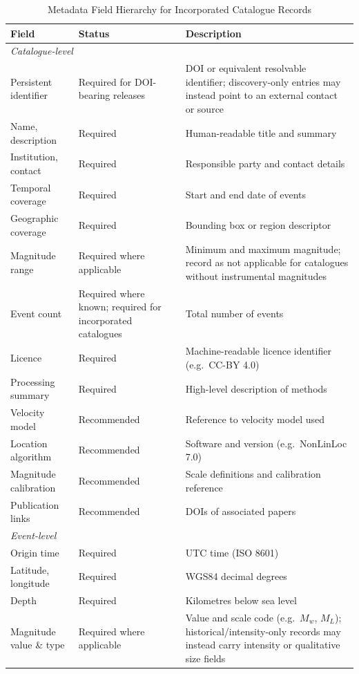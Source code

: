 \documentclass[11pt]{article}
\begin{document}
\begin{table}[H]
\centering
\small
\caption{Metadata Field Hierarchy for Incorporated Catalogue Records}
\label{tab:metadata_fields}
\setlength{\tabcolsep}{5pt}
\renewcommand{\arraystretch}{1.15}
\begin{tabular}{p{3.2cm} p{2.3cm} p{7.7cm}}
\toprule
\textbf{Field} & \textbf{Status} & \textbf{Description} \\
\midrule
\multicolumn{3}{l}{\textit{Catalogue-level}} \\
\midrule
Persistent identifier & Required for DOI-bearing releases & DOI or equivalent resolvable identifier; discovery-only entries may instead point to an external contact or source \\
Name, description & Required & Human-readable title and summary \\
Institution, contact & Required & Responsible party and contact details \\
Temporal coverage & Required & Start and end date of events \\
Geographic coverage & Required & Bounding box or region descriptor \\
Magnitude range & Required where applicable & Minimum and maximum magnitude; record as not applicable for catalogues without instrumental magnitudes \\
Event count & Required where known; required for incorporated catalogues & Total number of events \\
Licence & Required & Machine-readable licence identifier (e.g.\ CC-BY 4.0) \\
Processing summary & Required & High-level description of methods \\
Velocity model & Recommended & Reference to velocity model used \\
Location algorithm & Recommended & Software and version (e.g.\ NonLinLoc 7.0) \\
Magnitude calibration & Recommended & Scale definitions and calibration reference \\
Publication links & Recommended & DOIs of associated papers \\
\midrule
\multicolumn{3}{l}{\textit{Event-level}} \\
\midrule
Origin time & Required & UTC time (ISO 8601) \\
Latitude, longitude & Required & WGS84 decimal degrees \\
Depth & Required & Kilometres below sea level \\
Magnitude value \& type & Required where applicable & Value and scale code (e.g.\ $M_w$, $M_L$); historical/intensity-only records may instead carry intensity or qualitative size fields \\

\end{tabular}
\end{table}
\end{document}

